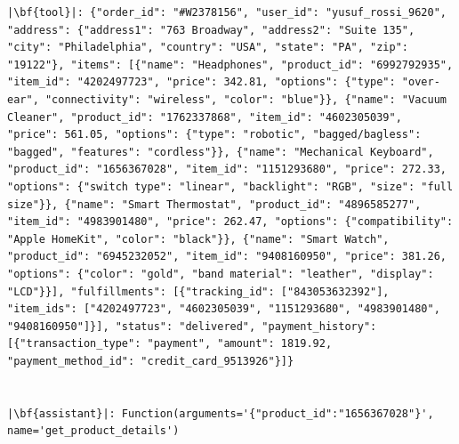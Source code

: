 \begin{longlisting}
\begin{verbatim}
|\bf{tool}|: {"order_id": "#W2378156", "user_id": "yusuf_rossi_9620", "address": {"address1": "763 Broadway", "address2": "Suite 135", "city": "Philadelphia", "country": "USA", "state": "PA", "zip": "19122"}, "items": [{"name": "Headphones", "product_id": "6992792935", "item_id": "4202497723", "price": 342.81, "options": {"type": "over-ear", "connectivity": "wireless", "color": "blue"}}, {"name": "Vacuum Cleaner", "product_id": "1762337868", "item_id": "4602305039", "price": 561.05, "options": {"type": "robotic", "bagged/bagless": "bagged", "features": "cordless"}}, {"name": "Mechanical Keyboard", "product_id": "1656367028", "item_id": "1151293680", "price": 272.33, "options": {"switch type": "linear", "backlight": "RGB", "size": "full size"}}, {"name": "Smart Thermostat", "product_id": "4896585277", "item_id": "4983901480", "price": 262.47, "options": {"compatibility": "Apple HomeKit", "color": "black"}}, {"name": "Smart Watch", "product_id": "6945232052", "item_id": "9408160950", "price": 381.26, "options": {"color": "gold", "band material": "leather", "display": "LCD"}}], "fulfillments": [{"tracking_id": ["843053632392"], "item_ids": ["4202497723", "4602305039", "1151293680", "4983901480", "9408160950"]}], "status": "delivered", "payment_history": [{"transaction_type": "payment", "amount": 1819.92, "payment_method_id": "credit_card_9513926"}]}


|\bf{assistant}|: Function(arguments='{"product_id":"1656367028"}', name='get_product_details')



\end{verbatim}
\end{longlisting}
